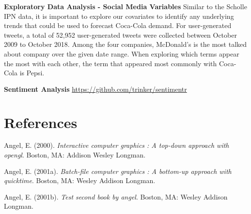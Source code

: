 \documentclass[12pt,oneside]{chicagocapstone}
\begin{document}
\textbf{Exploratory Data Analysis - Social Media Variables}
Similar to the Scholle IPN data, it is important to explore our covariates to identify any underlying trends that could be used to forecast Coca-Cola demand. For user-generated tweets, a total of 52,952 user-generated tweets were collected between October 2009 to October 2018. Among the four companies, McDonald's is the most talked about company over the given date range. When exploring which terms appear the most with each other, the term that appeared most commonly with Coca-Cola is Pepsi.

\textbf{Sentiment Analysis}
\url{https://github.com/trinker/sentimentr}

\backmatter

\hypertarget{references}{%
\chapter*{References}\label{references}}


\noindent

\setlength{\parindent}{-0.20in}
\setlength{\leftskip}{0.20in}
\setlength{\parskip}{8pt}

\hypertarget{refs}{}
\leavevmode\hypertarget{ref-angel2000}{}%
Angel, E. (2000). \emph{Interactive computer graphics : A top-down approach with opengl}. Boston, MA: Addison Wesley Longman.

\leavevmode\hypertarget{ref-angel2001}{}%
Angel, E. (2001a). \emph{Batch-file computer graphics : A bottom-up approach with quicktime}. Boston, MA: Wesley Addison Longman.

\leavevmode\hypertarget{ref-angel2002a}{}%
Angel, E. (2001b). \emph{Test second book by angel}. Boston, MA: Wesley Addison Longman.


\end{document}
